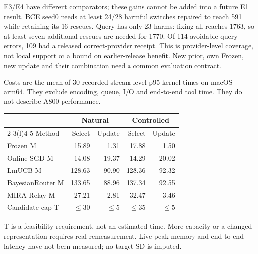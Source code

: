 \documentclass[10pt,letterpaper]{article}
\newcommand{\B}[1]{{\color{GuideBlue}#1}}
\newcommand{\note}[1]{{\fontsize{8.5}{10.5}\selectfont #1\par}}
\newcommand{\sect}[1]{\vspace{5pt}{\large\bfseries #1}\par\vspace{2pt}}
\newenvironment{clean}{\begin{center}\fontsize{9.5}{11.5}\selectfont\setlength{\tabcolsep}{6pt}\renewcommand{\arraystretch}{1.06}}{\end{center}}
\begin{document}
\note{E3/E4 have different comparators; these gains cannot be added into a future E1 result. BCE seed0 needs at least 24/28 harmful switches repaired to reach 591 while retaining its 16 rescues. Query has only 23 harms: fixing all reaches 1763, so at least seven additional rescues are needed for 1770. Of 114 avoidable query errors, 109 had a released correct-provider receipt. This is provider-level coverage, not local support or a bound on earlier-release benefit. New prior, own Frozen, new update and their combination need a common evaluation contract.}
\newpage
\sect{E5 / body Table 7: matched cost and feasibility}
Costs are the mean of 30 recorded stream-level p95 kernel times on macOS arm64.
They exclude encoding, queue, I/O and end-to-end tool time. They do not describe A800 performance.
\par\noindent\begin{minipage}{\linewidth}\end{minipage}\par
\begin{clean}\begin{tabular}{@{}lrrrr@{}}
\toprule
& \multicolumn{2}{c}{Natural} & \multicolumn{2}{c}{Controlled} \\ \cmidrule(lr){2-3}\cmidrule(l){4-5} Method & Select & Update & Select & Update \\
\midrule
Frozen M & 15.89 & 1.31 & 17.88 & 1.50 \\
Online SGD M & 14.08 & 19.37 & 14.29 & 20.02 \\
LinUCB M & 128.63 & 90.90 & 128.36 & 92.32 \\
BayesianRouter M & 133.65 & 88.96 & 137.34 & 92.55 \\
MIRA-Relay M & 27.21 & 2.81 & 32.47 & 3.46 \\
\B{Candidate cap T} & \B{$\leq30$} & \B{$\leq5$} & \B{$\leq35$} & \B{$\leq5$} \\
\bottomrule\end{tabular}\end{clean}
\note{T is a feasibility requirement, not an estimated time. More capacity or a changed representation requires real remeasurement. Live peak memory and end-to-end latency have not been measured; no target SD is imputed.}
\sect{E6 / body Table 8: coverage must match within each fitted policy}
\par\noindent\begin{minipage}{\linewidth}\end{minipage}\par
\end{document}
